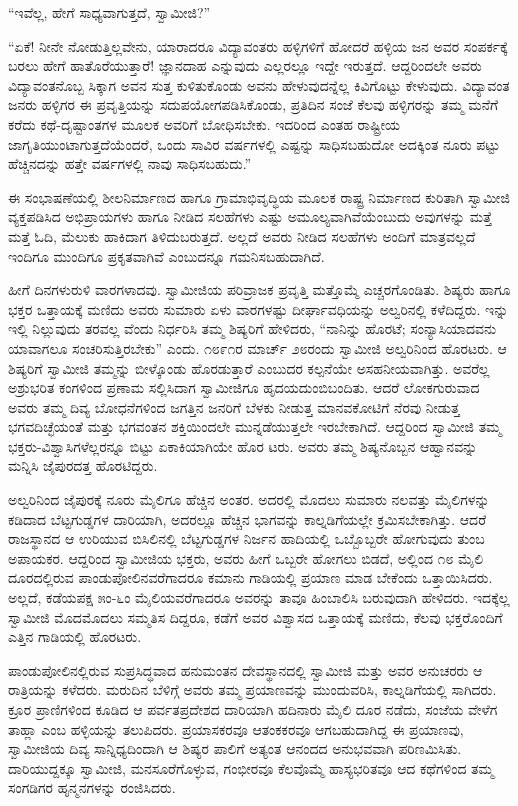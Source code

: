 “ಇವೆಲ್ಲ, ಹೇಗೆ ಸಾಧ್ಯವಾಗುತ್ತದೆ, ಸ್ವಾಮೀಜಿ?”

“ಏಕೆ! ನೀನೇ ನೋಡುತ್ತಿಲ್ಲವೇನು, ಯಾರಾದರೂ ವಿದ್ಯಾವಂತರು ಹಳ್ಳಿಗಳಿಗೆ ಹೋದರೆ ಹಳ್ಳಿಯ ಜನ ಅವರ ಸಂಪರ್ಕಕ್ಕೆ ಬರಲು ಹೇಗೆ ಹಾತೊರೆಯುತ್ತಾರೆ! ಜ್ಞಾನದಾಹ ಎನ್ನುವುದು ಎಲ್ಲರಲ್ಲೂ ಇದ್ದೇ ಇರುತ್ತದೆ. ಆದ್ದರಿಂದಲೇ ಅವರು ವಿದ್ಯಾವಂತನೊಬ್ಬ ಸಿಕ್ಕಾಗ ಅವನ ಸುತ್ತ ಕುಳಿತುಕೊಂಡು ಅವನು ಹೇಳುವುದನ್ನೆಲ್ಲ ಕಿವಿಗೊಟ್ಟು ಕೇಳುವುದು. ವಿದ್ಯಾವಂತ ಜನರು ಹಳ್ಳಿಗರ ಈ ಪ್ರವೃತ್ತಿಯನ್ನು ಸದುಪಯೋಗಪಡಿಸಿಕೊಂಡು, ಪ್ರತಿದಿನ ಸಂಜೆ ಕೆಲವು ಹಳ್ಳಿಗರನ್ನು ತಮ್ಮ ಮನೆಗೆ ಕರೆದು ಕಥೆ-ದೃಷ್ಟಾಂತಗಳ ಮೂಲಕ ಅವರಿಗೆ ಬೋಧಿಸಬೇಕು. ಇದರಿಂದ ಎಂತಹ ರಾಷ್ಟ್ರೀಯ ಜಾಗೃತಿಯುಂಟಾಗುತ್ತದೆಯೆಂದರೆ, ಒಂದು ಸಾವಿರ ವರ್ಷಗಳಲ್ಲಿ ಎಷ್ಟನ್ನು ಸಾಧಿಸಬಹುದೋ ಅದಕ್ಕಿಂತ ನೂರು ಪಟ್ಟು ಹೆಚ್ಚಿನದನ್ನು ಹತ್ತೇ ವರ್ಷಗಳಲ್ಲಿ ನಾವು ಸಾಧಿಸಬಹುದು.”

ಈ ಸಂಭಾಷಣೆಯಲ್ಲಿ ಶೀಲನಿರ್ಮಾಣದ ಹಾಗೂ ಗ್ರಾಮಾಭಿವೃದ್ಧಿಯ ಮೂಲಕ ರಾಷ್ಟ್ರ ನಿರ್ಮಾಣದ ಕುರಿತಾಗಿ ಸ್ವಾಮೀಜಿ ವ್ಯಕ್ತಪಡಿಸಿದ ಅಭಿಪ್ರಾಯಗಳು ಹಾಗೂ ನೀಡಿದ ಸಲಹೆಗಳು ಎಷ್ಟು ಅಮೂಲ್ಯವಾಗಿವೆಯೆಂಬುದು ಅವುಗಳನ್ನು ಮತ್ತೆ ಮತ್ತೆ ಓದಿ, ಮೆಲುಕು ಹಾಕಿದಾಗ ತಿಳಿದುಬರುತ್ತದೆ. ಅಲ್ಲದೆ ಅವರು ನೀಡಿದ ಸಲಹೆಗಳು ಅಂದಿಗೆ ಮಾತ್ರವಲ್ಲದೆ ಇಂದಿಗೂ ಮುಂದಿಗೂ ಪ್ರಕೃತವಾಗಿವೆ ಎಂಬುದನ್ನೂ ಗಮನಿಸಬಹುದಾಗಿದೆ.

ಹೀಗೆ ದಿನಗಳುರುಳಿ ವಾರಗಳಾದವು. ಸ್ವಾಮೀಜಿಯ ಪರಿವ್ರಾಜಕ ಪ್ರವೃತ್ತಿ ಮತ್ತೊಮ್ಮೆ ಎಚ್ಚರಗೊಂಡಿತು. ಶಿಷ್ಯರು ಹಾಗೂ ಭಕ್ತರ ಒತ್ತಾಯಕ್ಕೆ ಮಣಿದು ಅವರು ಸುಮಾರು ಏಳು ವಾರಗಳಷ್ಟು ದೀರ್ಘಾವಧಿಯನ್ನು ಅಲ್ವರಿನಲ್ಲಿ ಕಳೆದಿದ್ದರು. ಇನ್ನು ಇಲ್ಲಿ ನಿಲ್ಲುವುದು ತರವಲ್ಲ ವೆಂದು ನಿರ್ಧರಿಸಿ ತಮ್ಮ ಶಿಷ್ಯರಿಗೆ ಹೇಳಿದರು, “ನಾನಿನ್ನು ಹೊರಟೆ; ಸಂನ್ಯಾಸಿಯಾದವನು ಯಾವಾಗಲೂ ಸಂಚರಿಸುತ್ತಿರಬೇಕು” ಎಂದು. ೧೮೯೧ರ ಮಾರ್ಚ್ ೨೮ರಂದು ಸ್ವಾಮೀಜಿ ಅಲ್ವರಿನಿಂದ ಹೊರಟರು. ಆ ಶಿಷ್ಯರಿಗೆ ಸ್ವಾಮೀಜಿ ತಮ್ಮನ್ನು ಬೀಳ್ಕೊಂಡು ಹೊರಡುತ್ತಾರೆ ಎಂಬುದರ ಕಲ್ಪನೆಯೇ ಅಸಹನೀಯವಾಗಿತ್ತು. ಅವರೆಲ್ಲ ಅಶ್ರುಭರಿತ ಕಂಗಳಿಂದ ಪ್ರಣಾಮ ಸಲ್ಲಿಸಿದಾಗ ಸ್ವಾಮೀಜಿಗೂ ಹೃದಯದುಂಬಿಬಂದಿತು. ಆದರೆ ಲೋಕಗುರುವಾದ ಅವರು ತಮ್ಮ ದಿವ್ಯ ಬೋಧನೆಗಳಿಂದ ಜಗತ್ತಿನ ಜನರಿಗೆ ಬೆಳಕು ನೀಡುತ್ತ ಮಾನವಕೋಟಿಗೆ ನೆರವು ನೀಡುತ್ತ ಭಗವದಿಚ್ಛೆಯಂತೆ ಮತ್ತು ಭಗವಂತನ ಶಕ್ತಿಯಿಂದಲೇ ಮುನ್ನಡೆಯುತ್ತಲೇ ಇರಬೇಕಾಗಿದೆ. ಆದ್ದರಿಂದ ಸ್ವಾಮೀಜಿ ತಮ್ಮ ಭಕ್ತರು-ವಿಶ್ವಾಸಿಗಳೆಲ್ಲರನ್ನೂ ಬಿಟ್ಟು ಏಕಾಕಿಯಾಗಿಯೇ ಹೊರ ಟರು. ಅವರು ತಮ್ಮ ಶಿಷ್ಯನೊಬ್ಬನ ಆಹ್ವಾನವನ್ನು ಮನ್ನಿಸಿ ಜೈಪುರದತ್ತ ಹೊರಟಿದ್ದರು.

ಅಲ್ವರಿನಿಂದ ಜೈಪುರಕ್ಕೆ ನೂರು ಮೈಲಿಗೂ ಹೆಚ್ಚಿನ ಅಂತರ. ಅದರಲ್ಲಿ ಮೊದಲು ಸುಮಾರು ನಲವತ್ತು ಮೈಲಿಗಳನ್ನು ಕಡಿದಾದ ಬೆಟ್ಟಗುಡ್ಡಗಳ ದಾರಿಯಾಗಿ, ಅದರಲ್ಲೂ ಹೆಚ್ಚಿನ ಭಾಗವನ್ನು ಕಾಲ್ನಡಿಗೆಯಲ್ಲೇ ಕ್ರಮಿಸಬೇಕಾಗಿತ್ತು. ಆದರೆ ರಾಜಸ್ಥಾನದ ಆ ಉರಿಯುವ ಬಿಸಿಲಿನಲ್ಲಿ ಬೆಟ್ಟಗುಡ್ಡಗಳ ನಿರ್ಜನ ಹಾದಿಯಲ್ಲಿ ಒಬ್ಬೊಬ್ಬರೇ ಹೋಗುವುದು ತುಂಬ ಅಪಾಯಕರ. ಆದ್ದರಿಂದ ಸ್ವಾಮೀಜಿಯ ಭಕ್ತರು, ಅವರು ಹೀಗೆ ಒಬ್ಬರೇ ಹೋಗಲು ಬಿಡದೆ, ಅಲ್ಲಿಂದ ೧೮ ಮೈಲಿ ದೂರದಲ್ಲಿರುವ ಪಾಂಡುಪೋಲಿನವರೆಗಾದರೂ ಕಮಾನು ಗಾಡಿಯಲ್ಲಿ ಪ್ರಯಾಣ ಮಾಡ ಬೇಕೆಂದು ಒತ್ತಾಯಿಸಿದರು. ಅಲ್ಲದೆ, ಕಡೆಯಪಕ್ಷ ೫ಂ-೬ಂ ಮೈಲಿಯವರೆಗಾದರೂ ಅವರನ್ನು ತಾವೂ ಹಿಂಬಾಲಿಸಿ ಬರುವುದಾಗಿ ಹೇಳಿದರು. ಇದಕ್ಕೆಲ್ಲ ಸ್ವಾಮೀಜಿ ಮೊದಮೊದಲು ಸಮ್ಮತಿಸ ದಿದ್ದರೂ, ಕಡೆಗೆ ಅವರ ವಿಶ್ವಾಸದ ಒತ್ತಾಯಕ್ಕೆ ಮಣಿದು, ಕೆಲವು ಭಕ್ತರೊಂದಿಗೆ ಎತ್ತಿನ ಗಾಡಿಯಲ್ಲಿ ಹೊರಟರು.

ಪಾಂಡುಪೋಲಿನಲ್ಲಿರುವ ಸುಪ್ರಸಿದ್ಧವಾದ ಹನುಮಂತನ ದೇವಸ್ಥಾನದಲ್ಲಿ ಸ್ವಾಮೀಜಿ ಮತ್ತು ಅವರ ಅನುಚರರು ಆ ರಾತ್ರಿಯನ್ನು ಕಳೆದರು. ಮರುದಿನ ಬೆಳಿಗ್ಗೆ ಅವರು ತಮ್ಮ ಪ್ರಯಾಣವನ್ನು ಮುಂದುವರಿಸಿ, ಕಾಲ್ನಡಿಗೆಯಲ್ಲಿ ಸಾಗಿದರು. ಕ್ರೂರ ಪ್ರಾಣಿಗಳಿಂದ ಕೂಡಿದ ಆ ಪರ್ವತಪ್ರದೇಶದ ದಾರಿಯಾಗಿ ಹದಿನಾರು ಮೈಲಿ ದೂರ ನಡೆದು, ಸಂಜೆಯ ವೇಳೆಗ ತಾಹ್ಲಾ ಎಂಬ ಹಳ್ಳಿಯನ್ನು ತಲುಪಿದರು. ಪ್ರಯಾಸಕರವೂ ಆತಂಕಕರವೂ ಆಗಬಹುದಾಗಿದ್ದ ಈ ಪ್ರಯಾಣವು, ಸ್ವಾಮೀಜಿಯ ದಿವ್ಯ ಸಾನ್ನಿಧ್ಯದಿಂದಾಗಿ ಆ ಶಿಷ್ಯರ ಪಾಲಿಗೆ ಅತ್ಯಂತ ಆನಂದದ ಅನುಭವವಾಗಿ ಪರಿಣಮಿಸಿತು. ದಾರಿಯುದ್ದಕ್ಕೂ ಸ್ವಾಮೀಜಿ, ಮನಸೂರೆಗೊಳ್ಳುವ, ಗಂಭೀರವೂ ಕೆಲವೊಮ್ಮೆ ಹಾಸ್ಯಭರಿತವೂ ಆದ ಕಥೆಗಳಿಂದ ತಮ್ಮ ಸಂಗಡಿಗರ ಹೃನ್ಮನಗಳನ್ನು ರಂಜಿಸಿದರು.

